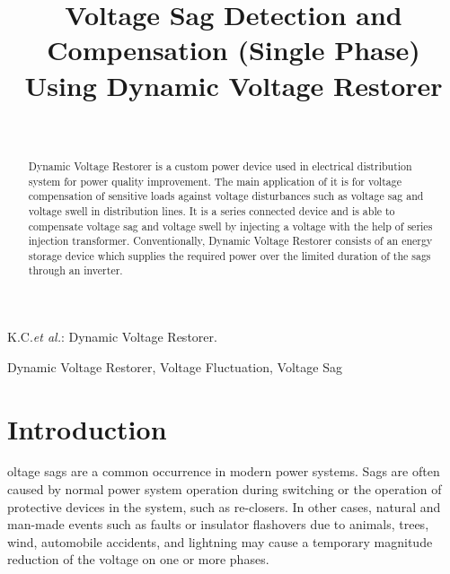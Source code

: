 \documentclass[journal,twoside]{IEEEtran}
\begin{document}
    \setcounter{page}{53}
    \title{Voltage Sag Detection and Compensation (Single Phase) Using Dynamic Voltage Restorer}
    \author{\\
    }

%
{K.C.\MakeLowercase{\textit{et al.}}: Dynamic Voltage Restorer.}
    \maketitle
	\begin{abstract}
Dynamic Voltage Restorer is a custom
power device used in electrical distribution system for
power quality improvement. The main application of it
is for voltage compensation of sensitive loads against
voltage disturbances such as voltage sag and voltage swell
in distribution lines. It is a series connected device and is
able to compensate voltage sag and voltage swell by
injecting a voltage with the help of series injection
transformer. Conventionally, Dynamic Voltage Restorer consists of an energy
storage device which supplies the required power over the
limited duration of the sags through an inverter.
	\end{abstract}
	\begin{IEEEkeywords}
Dynamic Voltage Restorer, Voltage Fluctuation, Voltage Sag 
	\end{IEEEkeywords}
	\section{Introduction}
oltage sags are a common occurrence in modern power systems. Sags are often caused by normal power system operation during switching or the operation of protective devices in the system, such as re-closers. In other cases, natural and man-made events such as faults or insulator
flashovers due to animals, trees, wind, automobile accidents, and lightning may cause a temporary magnitude reduction of the voltage on one or more phases.
\end{document}
